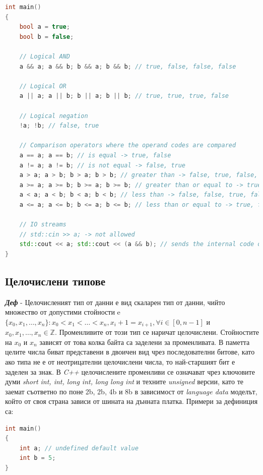 \documentclass[fleqn,12pt]{article}
\begin{document}
\begin{flushleft}
\begin{lstlisting}[language=C++, caption=Bool operators]
int main()
{
    bool a = true;
    bool b = false;

    // Logical AND
    a && a; a && b; b && a; b && b; // true, false, false, false

    // Logical OR
    a || a; a || b; b || a; b || b; // true, true, true, false

    // Logical negation
    !a; !b; // false, true

    // Comparison operators where the operand codes are compared
    a == a; a == b; // is equal -> true, false
    a != a; a != b; // is not equal -> false, true
    a > a; a > b; b > a; b > b; // greater than -> false, true, false, false
    a >= a; a >= b; b >= a; b >= b; // greater than or equal to -> true, true, false, true
    a < a; a < b; b < a; b < b; // less than -> false, false, true, false
    a <= a; a <= b; b <= a; b <= b; // less than or equal to -> true, false, true, true

    // IO streams
    // std::cin >> a; -> not allowed
    std::cout << a; std::cout << (a && b); // sends the internal code of the boolean expression to the stdout fd -> 1, 0
}
\end{lstlisting}

\subsection{Целочислени типове}

\textit{\textbf{Деф}} - Целочисленият тип от данни е вид скаларен тип от данни, чийто множество от допустими стойности e $\{x_0, x_1, \dots, x_n\}: x_0 < x_1 < \dots < x_n, x_i + 1 = x_{i+1}, \forall i \in [0, n-1]$ и $x_0, x_1, \dots, x_n \in \mathbb{Z}$.
Променливите от този тип се наричат целочислени. Стойностите на $x_0$ и $x_n$ зависят от това колка байта са заделени за променливата.
В паметта целите числа биват представени в двоичен вид чрез последователни битове, като ако типа не е от неотрицателни целочислени числа, то най-старшият бит е заделен за знак.
\bigbreak
В \textit{C++} целочислените променливи се означават чрез ключовите думи \textit{short int, int, long int, long long int} и техните \textit{unsigned} версии, като те заемат съответно по поне 2b, 2b, 4b и 8b в зависимост от \textit{language data} моделът, който от своя страна зависи от шината на дънната платка. Примери за дефиниция са:

\begin{lstlisting}[language=C++, caption=Integer variables]
int main()
{
    int a; // undefined default value
    int b = 5;
}
\end{lstlisting}


\end{flushleft}
\end{document}
